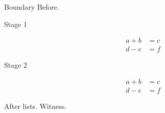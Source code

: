 \documentclass[11pt,aspectratio=169]{beamer}
\begin{document}
\begin{frame}[t]{Boundary}
Before.\par
\begin{description}
\item[Stage 1] \[\begin{aligned}a+b&=c\\ d-e&=f\end{aligned}\]
\item[Stage 2] \[\begin{aligned}a+b&=c\\ d-e&=f\end{aligned}\]
\end{description}
After lists.
Witness.\par
\end{frame}
\end{document}
